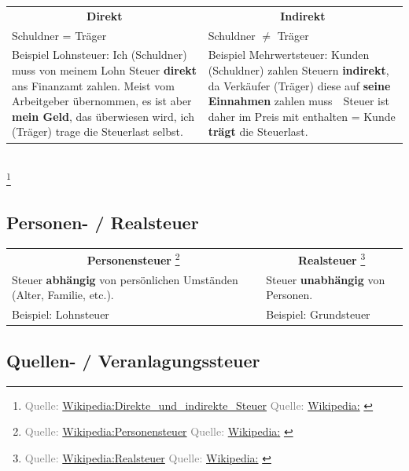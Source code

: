 \documentclass{beamer}
\let\oldfootnote\footnote
\renewcommand{\footnote}[1]
{%
	\oldfootnote
	{
		\tiny
		\textcolor{gray}{#1}
	}%
}
\newcommand{\citewiki}[2][]
{%
	\footnote
	{
		\ifthenelse{\isempty{#1}}
		{
			Quelle: \href{https://de.wikipedia.org/wiki/#2}{Wikipedia:#2}
		}
		{
			Quelle: \href{https://de.wikipedia.org/wiki/#2}{Wikipedia:#1}
		}
	}
}
\begin{document}
			\begin{frame}
				\begin{tabularx}{\linewidth}{X|X}
					\multicolumn{1}{c|}{\textbf{Direkt}} &
					\multicolumn{1}{c}{\textbf{Indirekt}} \\[0.25cm]
					Schuldner = Träger & Schuldner $\neq$ Träger \\
					\vspace{0.25cm}Beispiel Lohnsteuer: \newline
						Ich (Schuldner) muss von meinem Lohn Steuer \textbf{direkt} ans Finanzamt zahlen. Meist vom Arbeitgeber übernommen, es ist aber \textbf{mein Geld}, das überwiesen wird, ich (Träger) trage die Steuerlast selbst. & 
					\vspace{0.25cm}Beispiel Mehrwertsteuer: \newline
						Kunden (Schuldner) zahlen Steuern \textbf{indirekt}, da Verkäufer (Träger) diese auf \textbf{seine Einnahmen} zahlen muss\ \textrightarrow\ Steuer ist daher im Preis mit enthalten = Kunde \textbf{trägt} die Steuerlast.
				\end{tabularx}\\
				\citewiki{Direkte\_und\_indirekte\_Steuer}
			\end{frame}
		
		\subsection{Personen- / Realsteuer}
		
			\begin{frame}
				\begin{tabularx}{\linewidth}{X|X}
					\multicolumn{1}{c|}{\textbf{Personensteuer}\citewiki{Personensteuer}} &
					\multicolumn{1}{c}{\textbf{Realsteuer}\citewiki{Realsteuer}} \\[0.25cm]
					Steuer \textbf{abhängig} von persönlichen Umständen (Alter, Familie, etc.). & Steuer \textbf{unabhängig} von Personen. \\
					\vspace{0.25cm} Beispiel: Lohnsteuer &
					\vspace{0.25cm} Beispiel: Grundsteuer
				\end{tabularx}
			\end{frame}
		
		\subsection{Quellen- / Veranlagungssteuer}
		
\end{document}
